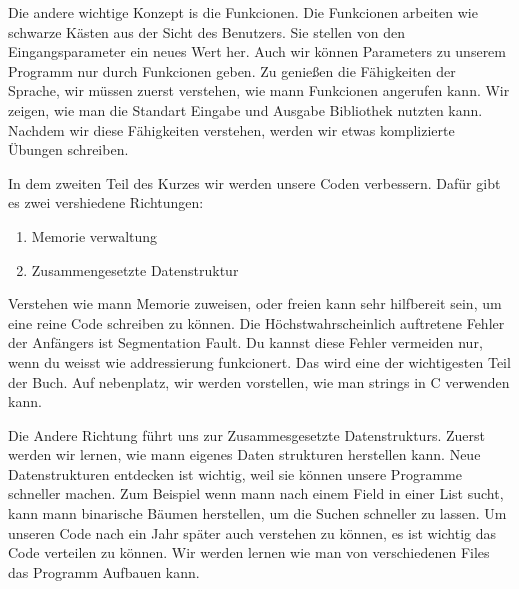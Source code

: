 \documentclass{article}[12pt]
\begin{document}
Die andere wichtige Konzept is die Funkcionen. Die Funkcionen arbeiten wie schwarze K\"asten aus der Sicht des Benutzers. Sie stellen von 
den Eingangsparameter ein neues Wert her. Auch wir können Parameters zu unserem Programm nur durch Funkcionen geben.  Zu genießen
die Fähigkeiten der Sprache, wir müssen zuerst verstehen, wie mann Funkcionen angerufen kann. Wir zeigen,
wie man die Standart Eingabe und Ausgabe Bibliothek nutzten kann. Nachdem wir diese F\"ahigkeiten verstehen, werden wir etwas
komplizierte \"Ubungen schreiben.

In dem zweiten Teil des Kurzes wir werden unsere Coden verbessern. Dafür gibt es zwei vershiedene
Richtungen:
\begin{enumerate}
\item Memorie verwaltung
\item Zusammengesetzte Datenstruktur
\end{enumerate}

Verstehen wie mann Memorie zuweisen, oder freien kann sehr hilfbereit sein, um eine reine Code schreiben zu können. 
Die Höchstwahrscheinlich auftretene Fehler der Anfängers ist Segmentation Fault. Du kannst diese Fehler vermeiden nur, wenn
du weisst wie addressierung funkcionert. Das wird eine der wichtigesten Teil der Buch. Auf nebenplatz, wir werden
vorstellen, wie man strings in C verwenden kann.

Die Andere Richtung führt uns zur Zusammesgesetzte Datenstrukturs. Zuerst werden wir lernen, wie mann eigenes Daten strukturen herstellen 
kann. Neue Datenstrukturen entdecken ist wichtig, weil sie können unsere Programme schneller machen. Zum Beispiel wenn mann nach
einem Field in einer List sucht, kann mann binarische Bäumen herstellen, um die Suchen schneller zu lassen. Um unseren Code
nach ein Jahr später auch verstehen zu können, es ist wichtig das Code verteilen zu können. Wir werden lernen wie man
von verschiedenen Files das Programm Aufbauen kann.


\end{document}
